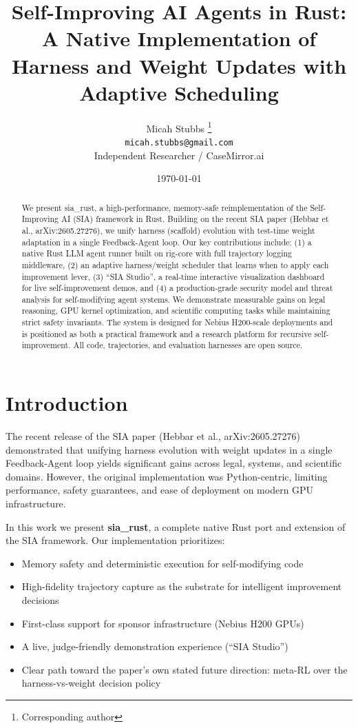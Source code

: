 \documentclass{article}
\title{Self-Improving AI Agents in Rust: A Native Implementation of Harness and Weight Updates with Adaptive Scheduling}
\author{
  Micah Stubbs \thanks{Corresponding author} \\
  \texttt{micah.stubbs@gmail.com} \\
  \small Independent Researcher / CaseMirror.ai
}
\date{\today}
\begin{document}
\maketitle

\begin{abstract}
We present sia\_rust, a high-performance, memory-safe reimplementation of the Self-Improving AI (SIA) framework in Rust. Building on the recent SIA paper (Hebbar et al., arXiv:2605.27276), we unify harness (scaffold) evolution with test-time weight adaptation in a single Feedback-Agent loop. Our key contributions include: (1) a native Rust LLM agent runner built on rig-core with full trajectory logging middleware, (2) an adaptive harness/weight scheduler that learns when to apply each improvement lever, (3) ``SIA Studio'', a real-time interactive visualization dashboard for live self-improvement demos, and (4) a production-grade security model and threat analysis for self-modifying agent systems. We demonstrate measurable gains on legal reasoning, GPU kernel optimization, and scientific computing tasks while maintaining strict safety invariants. The system is designed for Nebius H200-scale deployments and is positioned as both a practical framework and a research platform for recursive self-improvement. All code, trajectories, and evaluation harnesses are open source.
\end{abstract}


\section{Introduction}

The recent release of the SIA paper (Hebbar et al., arXiv:2605.27276) demonstrated that unifying harness evolution with weight updates in a single Feedback-Agent loop yields significant gains across legal, systems, and scientific domains. However, the original implementation was Python-centric, limiting performance, safety guarantees, and ease of deployment on modern GPU infrastructure.

In this work we present \textbf{sia\_rust}, a complete native Rust port and extension of the SIA framework. Our implementation prioritizes:
\begin{itemize}
    \item Memory safety and deterministic execution for self-modifying code
    \item High-fidelity trajectory capture as the substrate for intelligent improvement decisions
    \item First-class support for sponsor infrastructure (Nebius H200 GPUs)
    \item A live, judge-friendly demonstration experience (``SIA Studio'')
    \item Clear path toward the paper's own stated future direction: meta-RL over the harness-vs-weight decision policy
\end{itemize}
\end{document}
